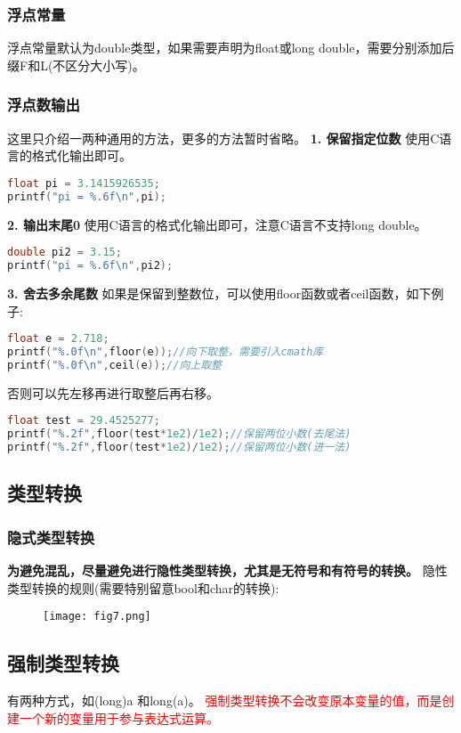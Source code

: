 \documentclass{article}
\begin{document}
    \subsubsection{浮点常量}
    浮点常量默认为double类型，如果需要声明为float或long double，需要分别添加后缀F和L(不区分大小写)。

    \subsubsection{浮点数输出}
    这里只介绍一两种通用的方法，更多的方法暂时省略。
    \textbf{1. 保留指定位数}
    使用C语言的格式化输出即可。
    \begin{lstlisting}[language=c++]
float pi = 3.1415926535;
printf("pi = %.6f\n",pi);
    \end{lstlisting}
    \textbf{2. 输出末尾0}
    使用C语言的格式化输出即可，注意C语言不支持long double。
    \begin{lstlisting}[language=c++]
double pi2 = 3.15;
printf("pi = %.6f\n",pi2);
    \end{lstlisting}
    \textbf{3. 舍去多余尾数}
    如果是保留到整数位，可以使用floor函数或者ceil函数，如下例子:
    \begin{lstlisting}[language=c++]
float e = 2.718;
printf("%.0f\n",floor(e));//向下取整，需要引入cmath库
printf("%.0f\n",ceil(e));//向上取整
    \end{lstlisting}
    否则可以先左移再进行取整后再右移。
    \begin{lstlisting}[language=c++]
float test = 29.4525277;
printf("%.2f",floor(test*1e2)/1e2);//保留两位小数(去尾法)
printf("%.2f",floor(test*1e2)/1e2);//保留两位小数(进一法)
    \end{lstlisting}

    \subsection{类型转换}
    \subsubsection{隐式类型转换}
    \textbf{为避免混乱，尽量避免进行隐性类型转换，尤其是无符号和有符号的转换。}
    隐性类型转换的规则(需要特别留意bool和char的转换):
    \begin{figure}[H]
        \centering
        \texttt{[image: fig7.png]}
    \end{figure}

    \subsection{强制类型转换}
    有两种方式，如(long)a 和long(a)。
    \textcolor{red}{强制类型转换不会改变原本变量的值，而是创建一个新的变量用于参与表达式运算。}
\end{document}
